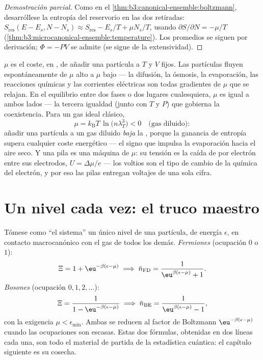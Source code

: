 \begin{proof}[Demostración parcial]
Como en el \cref{thm:b3:canonical-ensemble:boltzmann}, desarróllese la
entropía del reservorio en las dos retiradas:
$S_{\text{res}}(E - E_s, N - N_s) \approx S_{\text{res}} - E_s/T +
\mu N_s/T$, usando $\partial S/\partial N = -\mu/T$
(\cref{thm:b3:microcanonical-ensemble:temperature}). Los promedios
se siguen por derivación; $\Phi = -PV$ se admite (se sigue de la
extensividad).
\end{proof}

\begin{definition}\label{def:b3:grand-canonical:mu}
$\mu$ es el coste, en , de añadir una partícula a $T$ y $V$
fijos. Las partículas fluyen espontáneamente de $\mu$ alto a $\mu$
bajo --- la difusión, la ósmosis, la evaporación, las reacciones químicas y
las corrientes eléctricas son todas gradientes de $\mu$ que se relajan. En
el equilibrio entre dos fases o dos lugares cualesquiera, $\mu$ es igual a
ambos lados --- la tercera igualdad (junto con $T$ y $P$) que gobierna la
coexistencia. Para un gas ideal clásico,
\[
\mu = k_{\text{B}}T\,\ln\!\big(n\lambda_T^3\big) < 0
\quad\text{(gas diluido)} :
\]
añadir una partícula a un gas diluido \emph{baja} la ,
porque la ganancia de entropía supera cualquier coste energético --- el
signo que impulsa la evaporación hacia el aire seco. Y una pila es una
máquina de $\mu$: su tensión es la caída de  por electrón
entre sus electrodos, $U = \Delta\mu/e$ --- los voltios son el tipo de
cambio de la química del electrón, y por eso las pilas entregan voltajes de
una sola cifra.
\end{definition}

\section{Un nivel cada vez: el truco maestro}

\begin{theorem}\label{thm:b3:grand-canonical:occupation}
Tómese como ``el sistema'' un único nivel de una partícula, de energía
$\epsilon$, en contacto macrocanónico con el gas de todos los demás.
\emph{Fermiones} (ocupación $0$ o $1$):
\[
\Xi = 1 + \eu^{-\beta(\epsilon - \mu)}
\;\Longrightarrow\;
\bar n_{\text{FD}} = \frac{1}{\eu^{\beta(\epsilon - \mu)} + 1} .
\]
\emph{Bosones} (ocupación $0, 1, 2, \dots$):
\[
\Xi = \frac{1}{1 - \eu^{-\beta(\epsilon - \mu)}}
\;\Longrightarrow\;
\bar n_{\text{BE}} = \frac{1}{\eu^{\beta(\epsilon - \mu)} - 1} ,
\]
con la exigencia $\mu < \epsilon_{\min}$. Ambas se reducen al factor de
Boltzmann $\eu^{-\beta(\epsilon - \mu)}$ cuando las ocupaciones son escasas.
Estas dos fórmulas, obtenidas en dos líneas cada una, son todo el
material de partida de la estadística cuántica: el capítulo siguiente es su
cosecha.
\end{theorem}

